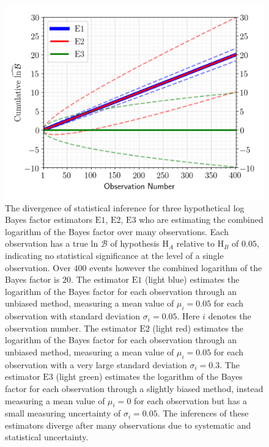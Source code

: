 \begin{figure}[th]
  \includegraphics[width=\textwidth]{figs/chapter5/example_log_bf_divergence.png}
  \caption{The divergence of statistical inference for three hypothetical log Bayes factor estimators $\mathrm{E1}$, $\mathrm{E2}$, $\mathrm{E3}$ who are estimating the combined logarithm of the Bayes factor over many observations. Each observation has a true ln $\mathcal{B}$ of hypothesis $\mathrm{H}_A$ relative to $\mathrm{H}_B$ of $0.05$, indicating no statistical significance at the level of a single observation. Over $400$ events however the combined logarithm of the Bayes factor is $20$. The estimator $\mathrm{E1}$ (light blue) estimates the logarithm of the Bayes factor for each observation through an unbiased method, measuring a mean value of $\mu_i = 0.05$ for each observation with standard deviation $\sigma_i = 0.05$. Here $i$ denotes the observation number. The estimator $\mathrm{E2}$ (light red) estimates the logarithm of the Bayes factor for each observation through an unbiased method, measuring a mean value of $\mu_i = 0.05$ for each observation with a very large standard deviation $\sigma_i=0.3$. The estimator $\mathrm{E3}$ (light green) estimates the logarithm of the Bayes factor for each observation through a slightly biased method, instead measuring a mean value of $\mu_i = 0$ for each observation but has a small measuring uncertainty of $\sigma_i=0.05$. The inferences of these estimators diverge after many observations due to systematic and statistical uncertainty.}
  \label{fig:LBFE}
\end{figure}


